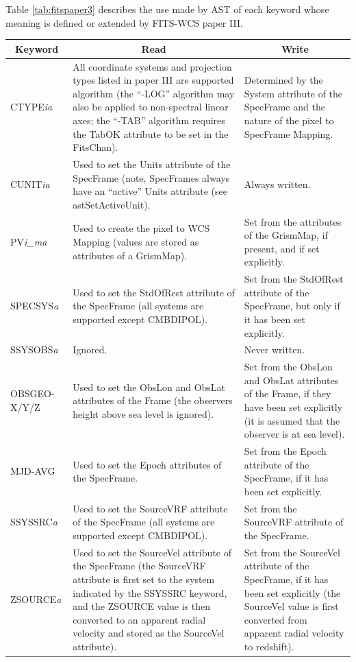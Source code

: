 \documentclass[twoside,11pt]{article}
\newcommand{\fitskey}[3]{{#1}&{#2}&{#3}\\}
\begin{document}
Table \ref{tab:fitspaper3} describes the use made by AST of each keyword
whose meaning is defined or extended by FITS-WCS paper III.

\begin{table}[htbp]
\begin{tabular}{|l|p{2.5in}|p{2.5in}|}
\hline
\multicolumn{1}{|c|}{{\bf Keyword}} & \multicolumn{1}{c|}{{\bf Read}}
& \multicolumn{1}{c|}{{\bf Write}} \\ \hline

\fitskey{CTYPE\emph{ia}}{All coordinate systems and projection types
listed in paper III are supported algorithm (the ``-LOG'' algorithm may
also be applied to non-spectral linear axes; the ``-TAB'' algorithm
requires the TabOK attribute to be set in the FitsChan).}{Determined by the System attribute of the
SpecFrame and the nature of the pixel to SpecFrame
Mapping.}

\fitskey{CUNIT\emph{ia}}{Used to set the Units attribute of
the SpecFrame (note, SpecFrames always have an ``active'' Units attribute
(see astSetActiveUnit).}{Always written.}

\fitskey{PV\emph{i\_ma}}{Used to create the pixel to WCS Mapping (values
are stored as attributes of a GrismMap).}
{Set from the attributes of the GrismMap, if present, and if set explicitly.}

\fitskey{SPECSYS\emph{a}}{Used to set the StdOfRest
attribute of the SpecFrame (all systems are supported except CMBDIPOL).}
{Set from the StdOfRest attribute of the SpecFrame, but only if it has been
set explicitly.}

\fitskey{SSYSOBS\emph{a}}{Ignored.}{Never written.}

\fitskey{OBSGEO-X/Y/Z}{Used to set the ObsLon and
ObsLat attributes of the Frame (the observers
height above sea level is ignored).}{Set from the ObsLon and ObsLat
attributes of the Frame, if they have been set explicitly (it is
assumed that the observer is at sea level).}

\fitskey{MJD-AVG}{Used to set the Epoch attributes of
the SpecFrame.}{Set from the Epoch attribute of the SpecFrame, if it has
been set explicitly.}

\fitskey{SSYSSRC\emph{a}}{Used to set the SourceVRF attribute of the
SpecFrame
(all systems are supported except CMBDIPOL).} {Set from the SourceVRF
attribute of the SpecFrame.}

\fitskey{ZSOURCE\emph{a}}{Used to set the SourceVel
attribute of the SpecFrame (the SourceVRF attribute
is first set to the system indicated by the SSYSSRC keyword, and the
ZSOURCE value is then converted to an apparent radial velocity and stored
as the SourceVel attribute).}
{Set from the SourceVel attribute of
the SpecFrame, if it has been set explicitly (the SourceVel value is
first converted from apparent radial velocity to redshift).}


\end{tabular}
\end{table}
\end{document}
